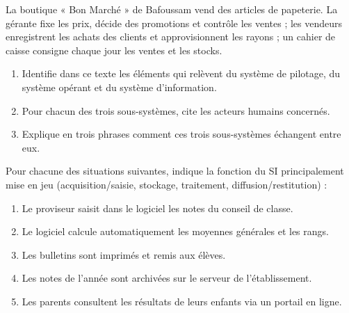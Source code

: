 \documentclass[11pt]{article}
\newcounter{popsec}
\newcounter{popsub}
\newcommand{\courssub}[1]{%
  \stepcounter{popsub}%
  \par\vspace{9pt}\noindent{\popxbold\fontsize{11.5}{13}\selectfont\color{popink}{\color{poporange}\thepopsec.\thepopsub}\hspace{6pt}#1}\par\nopagebreak\vspace{4pt}
}
\begin{document}
\courssub{Je m'entraîne}

\begin{exercice}
La boutique « Bon Marché » de Bafoussam vend des articles de papeterie. La gérante fixe les prix, décide des promotions et contrôle les ventes ; les vendeurs enregistrent les achats des clients et approvisionnent les rayons ; un cahier de caisse consigne chaque jour les ventes et les stocks.
\begin{enumerate}
  \item Identifie dans ce texte les éléments qui relèvent du système de pilotage, du système opérant et du système d'information.
  \item Pour chacun des trois sous-systèmes, cite les acteurs humains concernés.
  \item Explique en trois phrases comment ces trois sous-systèmes échangent entre eux.
\end{enumerate}
\end{exercice}

\begin{exercice}
Pour chacune des situations suivantes, indique la fonction du SI principalement mise en jeu (acquisition/saisie, stockage, traitement, diffusion/restitution) :
\begin{enumerate}
  \item Le proviseur saisit dans le logiciel les notes du conseil de classe.
  \item Le logiciel calcule automatiquement les moyennes générales et les rangs.
  \item Les bulletins sont imprimés et remis aux élèves.
  \item Les notes de l'année sont archivées sur le serveur de l'établissement.
  \item Les parents consultent les résultats de leurs enfants via un portail en ligne.
\end{enumerate}
\end{exercice}
\end{document}
